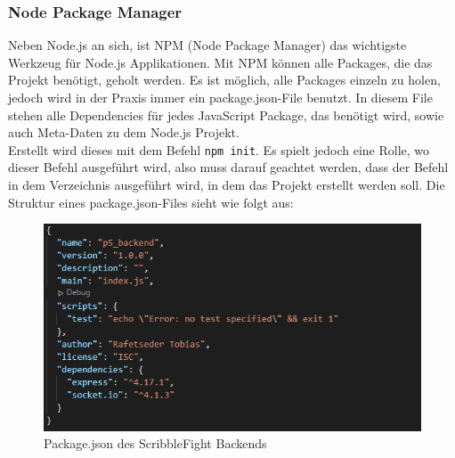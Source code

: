 


\subsubsection{Node Package Manager}\label{NPM}
Neben Node.js an sich, ist NPM (Node Package Manager) das wichtigste Werkzeug für Node.js Applikationen. Mit NPM können alle Packages, die das Projekt benötigt, geholt werden.
Es ist möglich, alle Packages einzeln zu holen, jedoch wird in der Praxis immer ein package.json-File benutzt. In diesem File stehen alle Dependencies für jedes JavaScript Package,
das benötigt wird, sowie auch Meta-Daten zu dem Node.js Projekt. \cite{node_environment}  \\
Erstellt wird dieses mit dem Befehl \texttt{npm init}. Es spielt jedoch eine Rolle, wo dieser Befehl ausgeführt wird, also muss darauf geachtet werden, dass der Befehl in dem Verzeichnis ausgeführt wird, in dem das Projekt erstellt werden soll.
Die Struktur eines package.json-Files sieht wie folgt aus:
\begin{figure}[H]
    \centering
    \includegraphics[scale=1]{pics/package json.PNG}
    \caption{Package.json des ScribbleFight Backends}
\end{figure}

